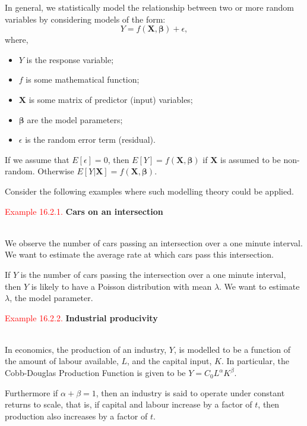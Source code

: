 \documentclass[
]{book}
\providecommand{\tightlist}{%
  \setlength{\itemsep}{0pt}\setlength{\parskip}{0pt}}
\begin{document}
In general, we statistically model the relationship between two or more random variables by considering models of the form:
\[Y = f(\mathbf{X},\mathbf{\beta})+\epsilon,\]
where,

\begin{itemize}
\tightlist
\item
  \(Y\) is the response variable;\\
\item
  \(f\) is some mathematical function;\\
\item
  \(\mathbf{X}\) is some matrix of predictor (input) variables;\\
\item
  \(\mathbf{\beta}\) are the model parameters;\\
\item
  \(\epsilon\) is the random error term (residual).
\end{itemize}

If we assume that \(E[\epsilon]=0\), then \(E[Y] = f(\mathbf{X},\mathbf{\beta})\) if \(\mathbf{X}\) is assumed to be non-random. Otherwise \(E[Y|\mathbf{X}] = f(\mathbf{X},\mathbf{\beta})\).

Consider the following examples where such modelling theory could be applied.

\leavevmode{}%
\textcolor{red}{Example 16.2.1.}
{\textbf{Cars on an intersection}}\\
\strut \\
We observe the number of cars passing an intersection over a one minute interval. We want to estimate the average rate at which cars pass this intersection.

If \(Y\) is the number of cars passing the intersection over a one minute interval, then \(Y\) is likely to have a Poisson distribution with mean \(\lambda\). We want to estimate \(\lambda\), the model parameter.

\hfill\break

\leavevmode{}%
\textcolor{red}{Example 16.2.2.}
{\textbf{Industrial producivity}}\\
\strut \\
In economics, the production of an industry, \(Y\), is modelled to be a function of the amount of labour available, \(L\), and the capital input, \(K\). In particular, the Cobb-Douglas Production Function is given to be \(Y = C_0 L^\alpha K^\beta\).

Furthermore if \(\alpha + \beta = 1\), then an industry is said to operate under constant returns to scale, that is, if capital and labour increase by a factor of \(t\), then production also increases by a factor of \(t\).
\end{document}
